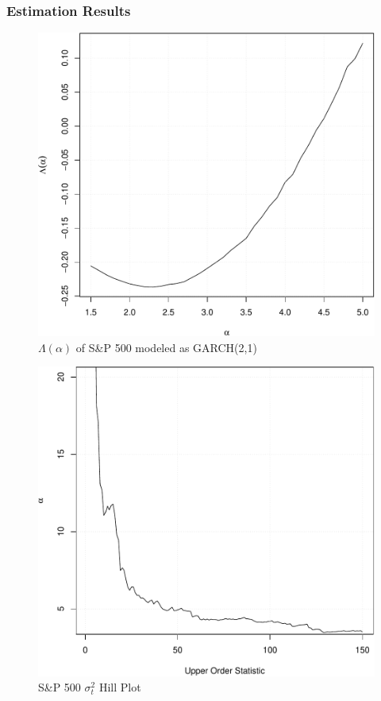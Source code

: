 \documentclass{beamer}
\begin{document}
 \begin{frame}
   \frametitle{Estimation Results}
   \begin{minipage}{0.5\linewidth}
   \begin{figure}[htb!]
     \centering
     \includegraphics[width=\linewidth]{Lambda.pdf}     
     \caption{\tiny $\Lambda(\alpha)$ of S\&P 500 modeled as GARCH(2,1)}
     \label{fig:SP500_Lambda}
   \end{figure}
   \end{minipage}\hfill
   \begin{minipage}{0.5\linewidth}
     \begin{figure}[htb!]
       \centering
       \includegraphics[width=\linewidth]{SP500_var_HillPlot.pdf}
       \caption{S\&P 500 $\sigma_t^2$ Hill Plot}
       \label{fig:SP500_var_HillPlot}
     \end{figure}
   \end{minipage}


\end{frame}
\end{document}
